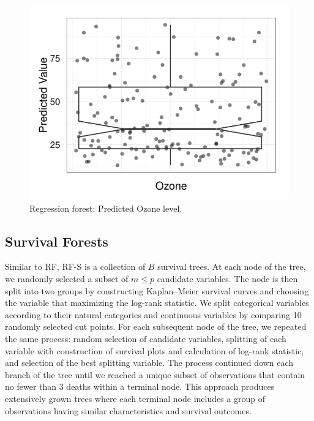 \documentclass[nojss,letterpaper]{jss}\usepackage[]{graphicx}\usepackage[]{color}
\makeatletter
\def\maxwidth{ %
  \ifdim\Gin@nat@width>\linewidth
    \linewidth
  \else
    \Gin@nat@width
  \fi
}
\newenvironment{knitrout}{}{} %
\makeatother
\begin{document}
\begin{knitrout}\footnotesize
{}\color{fgcolor}\begin{figure}[!htpb]

{\centering \includegraphics[width=\maxwidth]{figure/vig-airq-rf-plot-1} 

}

\caption[Regression forest]{Regression forest: Predicted Ozone level.\label{fig:airq-rf-plot}}
\end{figure}


\end{knitrout}


\subsection{Survival Forests}

 Similar to RF, RF-S is a collection of $B$ survival trees. At each node of the tree, we randomly selected a subset of $m \le p$ candidate variables. The node is then split into two groups by constructing Kaplan--Meier survival curves and choosing the variable that maximizing the log-rank statistic. We split categorical variables according to their natural categories and continuous variables by comparing 10 randomly selected cut points. For each subsequent node of the tree, we repeated the same process: random selection of candidate variables, splitting of each variable with construction of survival plots and calculation of log-rank statistic, and selection of the best splitting variable. The process continued down each branch of the tree until we reached a unique subset of observations that contain no fewer than 3 deaths within a terminal node. This approach produces extensively grown trees where each terminal node includes a group of observations having similar characteristics and survival outcomes.
 
\end{document}
